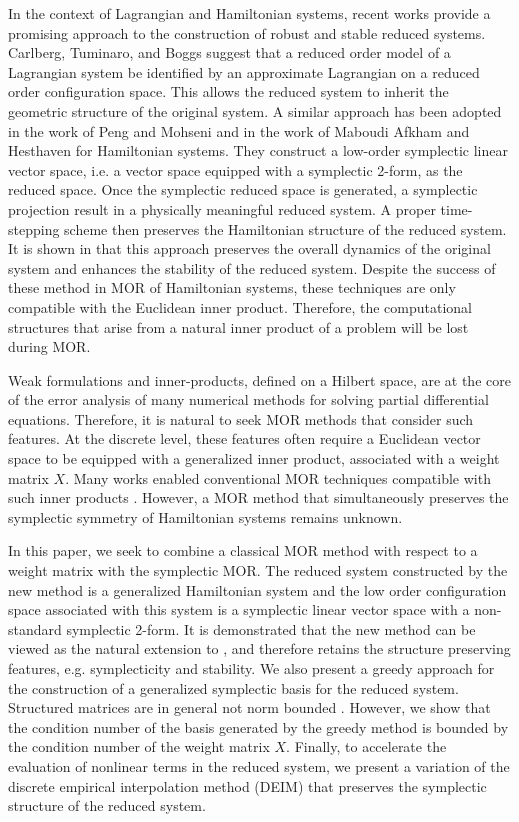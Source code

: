 In the context of Lagrangian and Hamiltonian systems, recent works provide a promising approach to the construction of robust and stable reduced systems. Carlberg, Tuminaro, and Boggs \cite{Carlberg:2014ky} suggest that a reduced order model of a Lagrangian system be identified by an approximate Lagrangian on a reduced order configuration space. This allows the reduced system to inherit the geometric structure of the original system. A similar approach has been adopted in the work of Peng and Mohseni \cite{doi:10.1137/140978922} and in the work of Maboudi Afkham and Hesthaven \cite{doi:10.1137/17M1111991} for Hamiltonian systems. They construct a low-order symplectic linear vector space, i.e. a vector space equipped with a symplectic 2-form, as the reduced space. Once the symplectic reduced space is generated, a symplectic projection result in a physically meaningful reduced system. A proper time-stepping scheme then preserves the Hamiltonian structure of the reduced system. It is shown in \cite{doi:10.1137/17M1111991,doi:10.1137/140978922} that this approach preserves the overall dynamics of the original system and enhances the stability of the reduced system. Despite the success of these method in MOR of Hamiltonian systems, these techniques are only compatible with the Euclidean inner product. Therefore, the computational structures that arise from a natural inner product of a problem will be lost during MOR.

Weak formulations and inner-products, defined on a Hilbert space, are at the core of the error analysis of many numerical methods for solving partial differential equations. Therefore, it is natural to seek MOR methods that consider such features. At the discrete level, these features often require a Euclidean vector space to be equipped with a generalized inner product, associated with a weight matrix $X$. Many works enabled conventional MOR techniques compatible with such inner products \cite{sen2006natural}. However, a MOR method that simultaneously preserves the symplectic symmetry of Hamiltonian systems remains unknown. 

In this paper, we seek to combine a classical MOR method with respect to a weight matrix with the symplectic MOR. The reduced system constructed by the new method is a generalized Hamiltonian system and the low order configuration space associated with this system is a symplectic linear vector space with a non-standard symplectic 2-form. It is demonstrated that the new method can be viewed as the natural extension to \cite{doi:10.1137/17M1111991}, and therefore retains the structure preserving features, e.g. symplecticity and stability. We also present a greedy approach for the construction of a generalized symplectic basis for the reduced system. Structured matrices are in general not norm bounded \cite{Karow:2006cf}. However, we show that the condition number of the basis generated by the greedy method is bounded by the condition number of the weight matrix $X$. Finally, to accelerate the evaluation of nonlinear terms in the reduced system, we present a variation of the discrete empirical interpolation method (DEIM) that preserves the symplectic structure of the reduced system.

